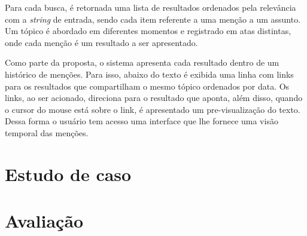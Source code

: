 
Para cada busca, é retornada uma lista de resultados ordenados pela relevância com a \textit{string} de entrada, sendo cada item referente a uma menção a um assunto. Um tópico é abordado em diferentes momentos e registrado em atas distintas, onde cada menção é um resultado a ser apresentado. 

Como parte da proposta, o sistema apresenta cada resultado dentro de um histórico de menções. Para isso, abaixo do texto é exibida uma linha com links para os resultados que compartilham o mesmo tópico ordenados por data. Os links, ao ser acionado, direciona para o resultado que aponta, além disso, quando o cursor do mouse está sobre o link, é apresentado um pre-visualização do texto. Dessa forma o usuário tem acesso uma interface que lhe fornece uma visão temporal das menções.





\section{Estudo de caso}


\section{Avaliação}

